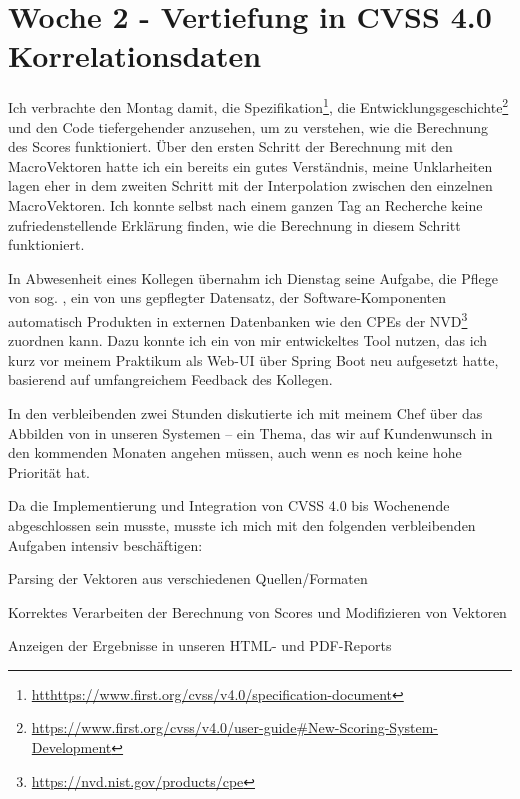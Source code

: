 \section{Woche 2 - Vertiefung in CVSS 4.0 \headerand Korrelationsdaten} \label{sec:bericht-wo-2-initial}


\lweekdaymarginpar{\weekdayMondayLong}

Ich verbrachte den Montag damit, die Spezifikation\footnote{\url{htthttps://www.first.org/cvss/v4.0/specification-document}},
die Entwicklungsgeschichte\footnote{\url{https://www.first.org/cvss/v4.0/user-guide\#New-Scoring-System-Development}}
und den Code tiefergehender anzusehen, um zu verstehen, wie die Berechnung des Scores funktioniert.
Über den ersten Schritt der Berechnung mit den MacroVektoren hatte ich ein bereits ein gutes Verständnis, meine Unklarheiten lagen eher in dem zweiten Schritt mit der Interpolation zwischen den einzelnen MacroVektoren.
Ich konnte selbst nach einem ganzen Tag an Recherche keine zufriedenstellende Erklärung finden, wie die Berechnung in diesem Schritt funktioniert.

\sweekdaymarginpar{\weekdayTuesdayShort, \weekdayWednesdayShort}

In Abwesenheit eines Kollegen übernahm ich Dienstag seine Aufgabe, die Pflege von sog. , ein von uns gepflegter Datensatz, der Software-Komponenten automatisch Produkten in externen Datenbanken wie den CPEs der NVD\footnote{\url{https://nvd.nist.gov/products/cpe}} zuordnen kann.
Dazu konnte ich ein von mir entwickeltes Tool nutzen, das ich kurz vor meinem Praktikum als Web-UI über Spring Boot neu aufgesetzt hatte, basierend auf umfangreichem Feedback des Kollegen.

In den verbleibenden zwei Stunden diskutierte ich mit meinem Chef über das Abbilden von  in unseren Systemen – ein Thema, das wir auf Kundenwunsch in den kommenden Monaten angehen müssen, auch wenn es noch keine hohe Priorität hat.

\sweekdaymarginpar{\weekdayThursdayLong}

Da die Implementierung und Integration von CVSS 4.0 bis Wochenende abgeschlossen sein musste, musste ich mich mit den folgenden verbleibenden Aufgaben intensiv beschäftigen:

\begin{smitemize}
    \item Parsing der Vektoren aus verschiedenen Quellen/Formaten
    \item Korrektes Verarbeiten der Berechnung von Scores und Modifizieren von Vektoren
    \item Anzeigen der Ergebnisse in unseren HTML- und PDF-Reports
\end{smitemize}

